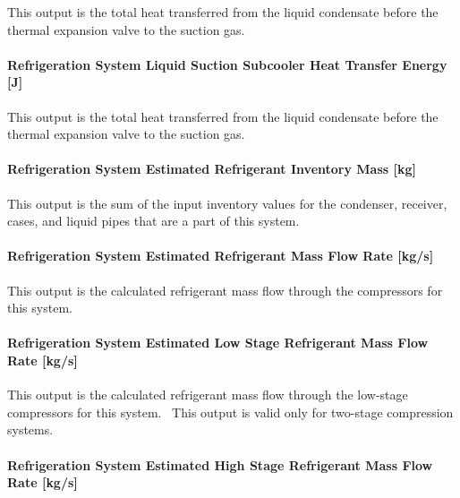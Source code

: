 This output is the total heat transferred from the liquid condensate before the thermal expansion valve to the suction gas.

\paragraph{Refrigeration System Liquid Suction Subcooler Heat Transfer Energy {[}J{]}}\label{refrigeration-system-liquid-suction-subcooler-heat-transfer-energy-j}

This output is the total heat transferred from the liquid condensate before the thermal expansion valve to the suction gas.

\paragraph{Refrigeration System Estimated Refrigerant Inventory Mass {[}kg{]}}\label{refrigeration-system-estimated-refrigerant-inventory-mass-kg}

This output is the sum of the input inventory values for the condenser, receiver, cases, and liquid pipes that are a part of this system.

\paragraph{Refrigeration System Estimated Refrigerant Mass Flow Rate {[}kg/s{]}}\label{refrigeration-system-estimated-refrigerant-mass-flow-rate-kgs}

This output is the calculated refrigerant mass flow through the compressors for this system.

\paragraph{Refrigeration System Estimated Low Stage Refrigerant Mass Flow Rate {[}kg/s{]}}\label{refrigeration-system-estimated-low-stage-refrigerant-mass-flow-rate-kgs}

This output is the calculated refrigerant mass flow through the low-stage compressors for this system.~ This output is valid only for two-stage compression systems.

\paragraph{Refrigeration System Estimated High Stage Refrigerant Mass Flow Rate {[}kg/s{]}}\label{refrigeration-system-estimated-high-stage-refrigerant-mass-flow-rate-kgs}

